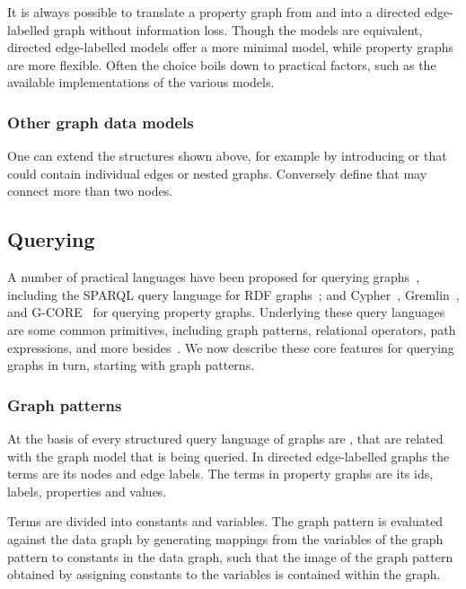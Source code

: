 It is always possible to translate a property graph from and into a directed edge-labelled graph without information loss. Though the models are equivalent, directed edge-labelled models offer a more minimal model, while property graphs are more flexible. Often the choice boils down to practical factors, such as the available implementations of the various models.

\subsubsection{Other graph data models}
One can extend the structures shown above, for example by introducing   or  that could contain individual edges or nested graphs. Conversely  define  that may connect more than two nodes.

\subsection{Querying}\label{querying}
A number of practical languages have been proposed for querying graphs~\cite{Angles2017FoundationmodernQueryLnguagesforGraphDatabases}, including the SPARQL query language for RDF graphs~\cite{Harris2013SPARQL}; and Cypher~\cite{Francis2018Cypher}, Gremlin~\cite{Rodriguez2015Gremlin}, and G-CORE~\cite{Angles2018G-CORE} for querying property graphs. Underlying these query languages are some common primitives, including graph patterns, relational operators, path expressions, and more besides~\cite{Angles2017FoundationmodernQueryLnguagesforGraphDatabases}. We now describe these core features for querying graphs in turn, starting with graph patterns. 

\subsubsection{Graph patterns}
At the basis of every structured query language of graphs are , that are related with the graph model that is being queried. In directed edge-labelled graphs the terms are its nodes and edge labels. The terms in property graphs are its ids, labels, properties and values.

Terms are divided into constants and variables. The graph pattern is evaluated against the data graph by generating mappings from the variables of the graph pattern to constants in the data graph, such that the image of the graph pattern obtained by assigning constants to the variables is contained within the graph. 


